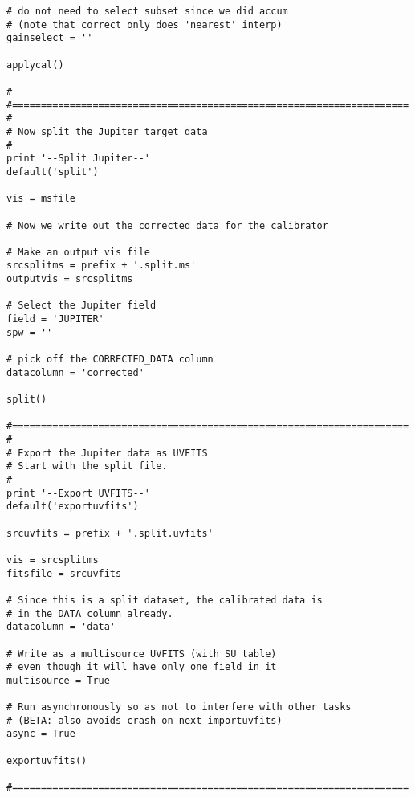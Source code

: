 \begin{verbatim}
# do not need to select subset since we did accum
# (note that correct only does 'nearest' interp)
gainselect = ''

applycal()

#
#=====================================================================
#
# Now split the Jupiter target data
#
print '--Split Jupiter--'
default('split')

vis = msfile

# Now we write out the corrected data for the calibrator

# Make an output vis file
srcsplitms = prefix + '.split.ms'
outputvis = srcsplitms

# Select the Jupiter field
field = 'JUPITER'
spw = ''

# pick off the CORRECTED_DATA column
datacolumn = 'corrected'

split()

#=====================================================================
#
# Export the Jupiter data as UVFITS
# Start with the split file.
#
print '--Export UVFITS--'
default('exportuvfits')

srcuvfits = prefix + '.split.uvfits'

vis = srcsplitms
fitsfile = srcuvfits

# Since this is a split dataset, the calibrated data is
# in the DATA column already.
datacolumn = 'data'

# Write as a multisource UVFITS (with SU table)
# even though it will have only one field in it
multisource = True

# Run asynchronously so as not to interfere with other tasks
# (BETA: also avoids crash on next importuvfits)
async = True

exportuvfits()

#=====================================================================
\end{verbatim}
\normalsize

